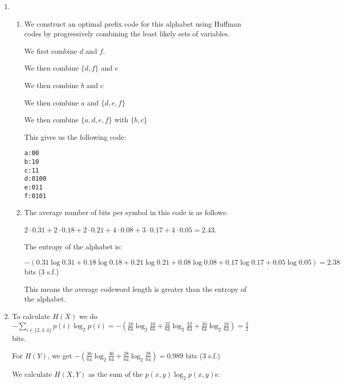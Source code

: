 


\begin{enumerate}[label=(\alph*)]

  \item
    \begin{enumerate}[label=(\roman*)]

      \item

        We construct an optimal prefix code for this alphabet  using Huffman codes by progressively combining the least likely sets of variables.

        We first combine $d$ and $f$.

        We then combine $\{d,f\}$ and $e$

        We then combine $b$ and $c$

        We then combine $a$ and $\{d,e,f\}$

        We then combine $\{a,d,e,f\}$ with $\{b,c\}$

        This gives us the following code:

\begin{verbatim}
a:00
b:10 
c:11
d:0100
e:011 
f:0101
\end{verbatim}

\item
  The average number of bits per symbol in this code is as follows:

  $2 \cdot 0.31 + 2 \cdot 0.18 + 2 \cdot 0.21 + 4 \cdot 0.08 + 3 \cdot 0.17 + 4 \cdot 0.05 = 2.43$.

  The entropy of the alphabet is:

  $-(0.31 \log 0.31 + 0.18 \log 0.18 + 0.21 \log 0.21 + 0.08 \log 0.08 + 0.17 \log 0.17 + 0.05 \log 0.05) = 2.38$ bits (3 s.f.)

  This means the average codeword length is greater than the entropy of the alphabet.
    \end{enumerate}

  \item

    To calculate $H(X)$ we do $-\sum_{i \in \{2,3,4\}} p(i)\log_2 p(i) = -(\frac{16}{64} \log_2 \frac{16}{64} + \frac{32}{64} \log_2 \frac{32}{64} + \frac{16}{64} \log_2 \frac{16}{64}) = \frac{3}{2}$ bits.

    For $H(Y)$, we get $-(\frac{36}{64} \log_2 \frac{36}{64} + \frac{28}{64} \log_2 \frac{28}{64}) = 0.989$ bits (3 s.f.)

    We calculate $H(X,Y)$ as the sum of the $p(x,y)\log_2 p(x,y)$s:


\end{enumerate}
